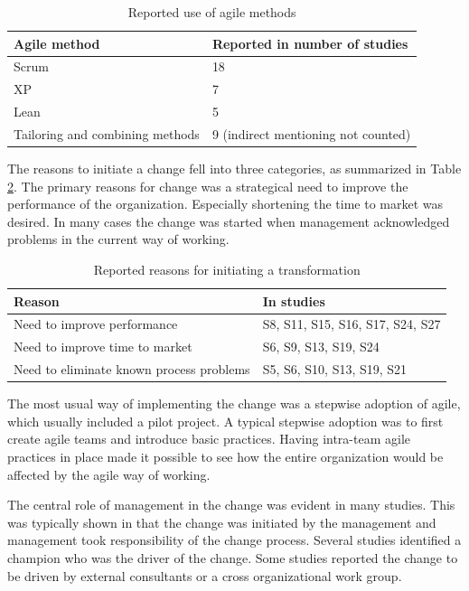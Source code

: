 \documentclass[lnbip]{svmultln}
\begin{document}
\begin{table}[t]
    \begin{tabular}{ l@{ \hskip 0.4cm } l }
        \toprule
        Agile method    & Reported in number of studies   \\ \midrule
        Scrum           & 18 \\ 
        XP              & 7 \\
        Lean            & 5 \\
        Tailoring and combining methods & 9  (indirect mentioning not counted) \\
        \bottomrule
    \end{tabular}
    \caption{Reported use of agile methods}
    \label{table:methods}
\end{table}


The reasons to initiate a change fell into three categories, as summarized in
Table \ref{table:motivations}. The primary reasons for change was a strategical
need to improve the performance of the organization. Especially shortening the
time to market was desired. In many cases the change was started when management
acknowledged problems in the current way of working.

\begin{table}[t]
    \begin{tabular}{ l@{ \hskip 0.4cm } l }
        \toprule
        Reason                                    & In studies   \\ \midrule
        Need to improve performance               & S8, S11, S15, S16, S17, S24, S27 \\ 
        Need to improve time to market            & S6, S9, S13, S19, S24 \\
        Need to eliminate known process problems  & S5, S6, S10, S13, S19, S21 \\
        \bottomrule
    \end{tabular}
    \caption{Reported reasons for initiating a transformation}
    \label{table:motivations}
\end{table}


The most usual way of implementing the change was a stepwise adoption of agile,
which usually included a pilot project. A typical stepwise adoption was to first
create agile teams and introduce basic practices. Having intra-team agile
practices in place made it possible to see how the entire organization would be
affected by the agile way of working.

The central role of management in the change was evident in many studies. This
was typically shown in that the change was initiated by the management and
management took responsibility of the change process. Several studies identified
a champion who was the driver of the change. Some studies reported the change to
be driven by external consultants or a cross organizational work group.
\end{document}

